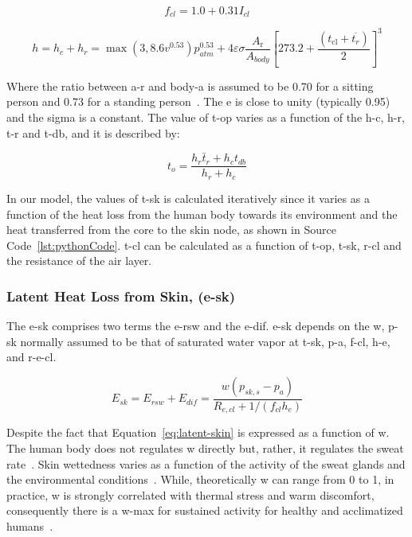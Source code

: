 \begin{equation}
    f_{cl}=1.0 + 0.31 I_{cl} \label{eq:f-cl}
\end{equation}

\begin{equation}
    h=h_{c} + h_{r} = \max(3, 8.6 v^{0.53}) p_{atm}^{0.53} + 4 \varepsilon \sigma \frac{A_{\mathrm{r}}}{A_{body}}\left[273.2+\frac{\left(t_{\mathrm{cl}}+\overline{t_{r}}\right)}{2}\right]^{3}\label{eq:h}
\end{equation}

Where the ratio between \ac{a-r} and \ac{body-a} is assumed to be 0.70 for a sitting person and 0.73 for a standing person~\cite{Fanger1967}.
The \ac{e} is close to unity (typically 0.95) and the \ac{sigma} is a constant.
The value of \ac{t-op} varies as a function of the \ac{h-c}, \ac{h-r}, \ac{t-r} and \ac{t-db}, and it is described by:

\begin{equation}
    t_{o}=\frac{h_{r} \bar{t}_{r}+h_{c} t_{db}}{h_{r}+h_{c}}\label{eq:t-op}
\end{equation}

In our model, the values of \ac{t-sk} is calculated iteratively since it varies as a function of the heat loss from the human body towards its environment and the heat transferred from the core to the skin node, as shown in Source Code~\ref{lst:pythonCode}.
\Ac{t-cl} can be calculated as a function of \ac{t-op}, \ac{t-sk}, \ac{r-cl} and the resistance of the air layer.

\subsubsection{Latent Heat Loss from Skin, (\acs{e-sk})}

The \acf{e-sk} comprises two terms the \ac{e-rsw} and the \ac{e-dif}.
\ac{e-sk} depends on the \ac{w}, \ac{p-sk} normally assumed to be that of saturated water vapor at \ac{t-sk}, \ac{p-a}, \ac{f-cl}, \ac{h-e}, and \ac{r-e-cl}.

\begin{equation}
    E_{s k}=E_{rsw}+E_{dif}=\frac{w\left(p_{s k, s}-p_{a}\right)}{R_{e, c l}+1 /\left(f_{c l} h_{e}\right)}\label{eq:latent-skin}
\end{equation}

Despite the fact that Equation~\ref{eq:latent-skin} is expressed as a function of \ac{w}.
The human body does not regulates \ac{w} directly but, rather, it regulates the sweat rate~\cite{ASHRA2017}.
Skin wettedness varies as a function of the activity of the sweat glands and the environmental conditions~\cite{ASHRA2017}.
While, theoretically \ac{w} can range from 0 to 1, in practice, \ac{w} is strongly correlated with thermal stress and warm discomfort, consequently there is a \ac{w-max} for sustained activity for healthy and acclimatized humans~\cite{ASHRA2017}.

